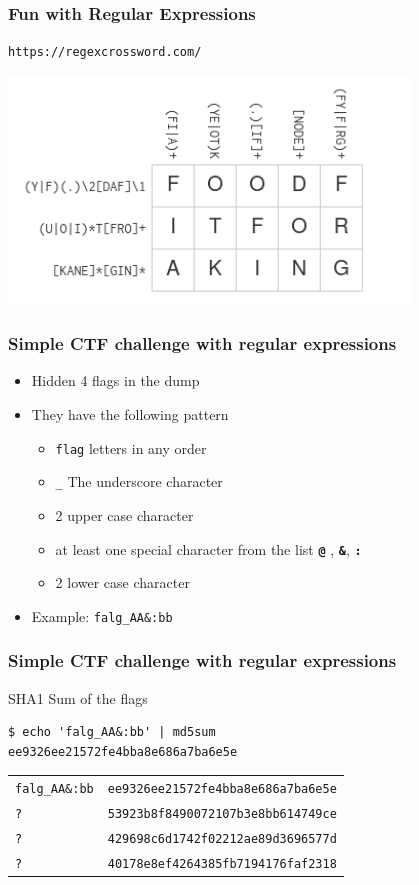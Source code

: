 \documentclass{beamer}
\begin{document}
\begin{frame}[fragile]
\frametitle{Fun with Regular Expressions}
\texttt{https://regexcrossword.com/}
\begin{center}
\includegraphics[width=0.8\textwidth]{pics/crosswords-solved.png}
\end{center}
\end{frame}

\begin{frame}[fragile]
    \frametitle{Simple CTF challenge with regular expressions}
    \begin{itemize}
        \item Hidden 4 flags in the dump
        \item They have the following pattern
        \begin{itemize}
            \item \texttt{flag} letters in any order
            \item \texttt{\_} The underscore character
            \item 2 upper case character
            \item at least one special character from the list \texttt{\textbf{@}} , \texttt{\textbf{\&}}, \texttt{\textbf{:}}
            \item 2 lower case character
        \end{itemize}
        \item Example: \texttt{falg\_AA\&:bb}
    \end{itemize}
\end{frame}

\begin{frame}[fragile]
    \frametitle{Simple CTF challenge with regular expressions}
    SHA1 Sum of the flags
\begin{lstlisting}
$ echo 'falg_AA&:bb' | md5sum
ee9326ee21572fe4bba8e686a7ba6e5e
\end{lstlisting}
    \begin{tabular}{ lr } 
        \texttt{falg\_AA\&:bb} & \texttt{ee9326ee21572fe4bba8e686a7ba6e5e} \\
        \texttt{?} & \texttt{53923b8f8490072107b3e8bb614749ce} \\
        \texttt{?} & \texttt{429698c6d1742f02212ae89d3696577d} \\
        \texttt{?} & \texttt{40178e8ef4264385fb7194176faf2318} \\
       \end{tabular}
\end{frame}
\end{document}
